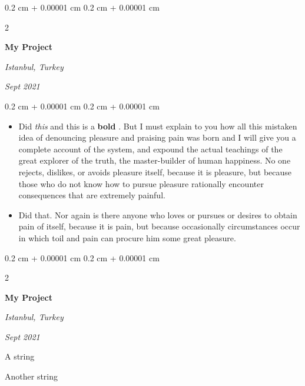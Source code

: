 \documentclass[10pt, letterpaper]{article}
\newenvironment{summary}{
    \begin{description}[
        topsep=0.10 cm,
        parsep=0.10 cm,
        partopsep=0pt,
        itemsep=0pt,
        leftmargin=0.4 cm + 10pt
    ]
}{
    \end{description}
} %
\newenvironment{highlights}{
    \begin{itemize}[
        topsep=0.10 cm,
        parsep=0.10 cm,
        partopsep=0pt,
        itemsep=0pt,
        leftmargin=0.4 cm + 10pt
    ]
}{
    \end{itemize}
} %
\newenvironment{onecolentry}{
    \begin{adjustwidth}{
        0.2 cm + 0.00001 cm
    }{
        0.2 cm + 0.00001 cm
    }
}{
    \end{adjustwidth}
} %
\newenvironment{twocolentry}[2][]{
    \onecolentry
    \def\secondColumn{#2}
    \setcolumnwidth{\fill, 4.5 cm}
    \begin{paracol}{2}
}{
    \switchcolumn \raggedleft \secondColumn
    \end{paracol}
    \endonecolentry
} %
\let\hrefWithoutArrow\href
\renewcommand{\href}[2]{\hrefWithoutArrow{#1}{\ifthenelse{\equal{#2}{}}{ }{#2 }\raisebox{.15ex}{\footnotesize \faExternalLink*}}}
\begin{document}
        \vspace{0.2 cm}

        \begin{twocolentry}{
        \textit{Istanbul, Turkey}    
            
        \textit{Sept 2021}}
            \textbf{My Project}
        \end{twocolentry}
        \vspace{0.10 cm}
        \begin{onecolentry}
            \begin{highlights}
                \item Did \textit{this} and this is a \textbf{bold} \href{https://example.com}{link}. But I must explain to you how all this mistaken idea of denouncing pleasure and praising pain was born and I will give you a complete account of the system, and expound the actual teachings of the great explorer of the truth, the master-builder of human happiness. No one rejects, dislikes, or avoids pleasure itself, because it is pleasure, but because those who do not know how to pursue pleasure rationally encounter consequences that are extremely painful.
                \item Did that. Nor again is there anyone who loves or pursues or desires to obtain pain of itself, because it is pain, but because occasionally circumstances occur in which toil and pain can procure him some great pleasure.
            \end{highlights}
        \end{onecolentry}


        \vspace{0.2 cm}

        \begin{twocolentry}{
        \textit{Istanbul, Turkey}    
            
        \textit{Sept 2021}}
            \textbf{My Project}
        \end{twocolentry}
            \begin{summary}
                \item A string
                \item Another string
            \end{summary}


        \vspace{0.2 cm}
\end{document}
